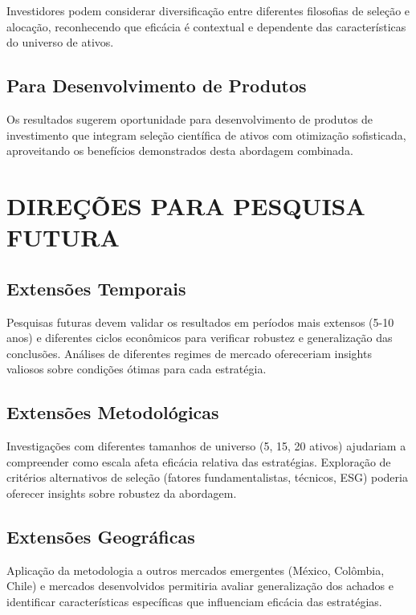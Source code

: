 Investidores podem considerar diversificação entre diferentes filosofias de seleção e alocação, reconhecendo que eficácia é contextual e dependente das características do universo de ativos.

\subsection{Para Desenvolvimento de Produtos}

Os resultados sugerem oportunidade para desenvolvimento de produtos de investimento que integram seleção científica de ativos com otimização sofisticada, aproveitando os benefícios demonstrados desta abordagem combinada.

\section{DIREÇÕES PARA PESQUISA FUTURA}

\subsection{Extensões Temporais}

Pesquisas futuras devem validar os resultados em períodos mais extensos (5-10 anos) e diferentes ciclos econômicos para verificar robustez e generalização das conclusões. Análises de diferentes regimes de mercado ofereceriam insights valiosos sobre condições ótimas para cada estratégia.

\subsection{Extensões Metodológicas}

Investigações com diferentes tamanhos de universo (5, 15, 20 ativos) ajudariam a compreender como escala afeta eficácia relativa das estratégias. Exploração de critérios alternativos de seleção (fatores fundamentalistas, técnicos, ESG) poderia oferecer insights sobre robustez da abordagem.

\subsection{Extensões Geográficas}

Aplicação da metodologia a outros mercados emergentes (México, Colômbia, Chile) e mercados desenvolvidos permitiria avaliar generalização dos achados e identificar características específicas que influenciam eficácia das estratégias.

